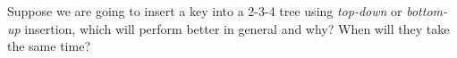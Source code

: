 Suppose we are going to insert a key into a 2-3-4 tree using 
{\em top-down} or {\em bottom-up} insertion, which will perform
better in general and why? When will they take the same time?
